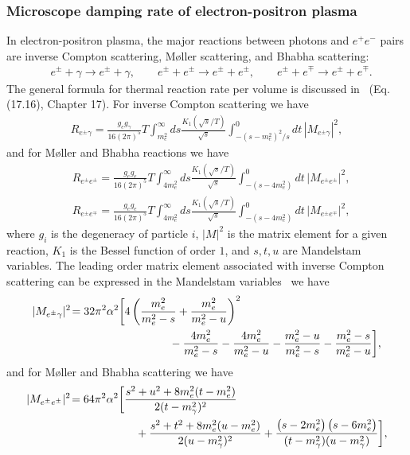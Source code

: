 \subsubsection{Microscope damping rate of electron-positron plasma}\label{relax}
In electron-positron plasma, the major reactions between photons and $e^+e^-$ pairs are inverse Compton scattering, M{\o}ller scattering, and Bhabha scattering:
\begin{align}
&e^\pm+\gamma\longrightarrow e^\pm+\gamma,\qquad e^\pm+e^\pm\longrightarrow e^\pm+e^\pm,\qquad e^\pm+e^\mp\longrightarrow e^\pm+e^\mp.
\end{align}
The general formula for thermal reaction rate per volume is discussed in~\cite{Letessier:2002ony} (Eq.(17.16), Chapter 17). For inverse Compton scattering we have
\begin{align}
R_{e^{\pm}\gamma}=\frac{g_eg_\gamma}{16\left(2\pi\right)^5}T\int_{m_e^2}^\infty\!\!\!\!ds\frac{K_1(\sqrt{s}/T)}{\sqrt{s}}\int^0_{-(s-m_e^2)^2/s}\!\!\!\!\!\!\!\!\!\!\!\!\!\!\!\!dt\, |M_{e^{\pm}\gamma}|^2,
\end{align} 
and for M{\o}ller and Bhabha reactions we have
\begin{align}
&R_{e^\pm e^\pm}=\frac{g_eg_e}{16\left(2\pi\right)^5}T\!\!\int_{4m_e^2}^\infty\!\!\!\!ds\frac{K_1(\sqrt{s}/T)}{\sqrt{s}}\int^0_{-(s-4m_e^2)}\!\!\!\!\!\!\!\!\!\!\!\!\!\!\!\!dt\,|M_{e^\pm e^\pm}|^2,\\
&R_{e^\pm e^\mp}=\frac{g_eg_e}{16\left(2\pi\right)^5}T\!\!\int_{4m_e^2}^\infty\!\!\!\!ds\frac{K_1(\sqrt{s}/T)}{\sqrt{s}}\int^0_{-(s-4m_e^2)}\!\!\!\!\!\!\!\!\!\!\!\!\!\!\!\!dt\,|M_{e^\pm e^\mp}|^2,
\end{align}
where $g_i$ is the degeneracy of particle $i$, $|M|^2$ is the matrix element for a given reaction, $K_1$ is the Bessel function of order $1$, and $s,t,u$ are Mandelstam variables. The leading order matrix element associated with inverse Compton scattering can be expressed in the Mandelstam variables~\cite{Kuznetsova:2011wt,Kuznetsova:2009bq} we have
\begin{align}
|M_{e^\pm\gamma}|^2\!=32 \pi^2\alpha^2\bigg[&4\left(\frac{m_e^2}{m_e^2-s}+\frac{m_e^2}{m_e^2-u}\right)^2\notag\\
&\qquad\qquad-\frac{4m_e^2}{m_e^2-s}-\frac{4m_e^2}{m_e^2-u} -
 \frac{m_e^2-u}{m_e^2-s} -\frac{m_e^2-s}{m_e^2-u}\bigg],
\end{align}
and for M{\o}ller and Bhabha scattering we have 
\begin{align}
|M_{e^{\pm}e^{\pm}}|^{2}\!=64\pi^{2}\alpha^{2}\bigg[&
\frac{s^{2}+u^{2}+8m_e^{2}(t-m_e^{2})}{2(t-m^2_{\gamma})^{2}}\notag\\
&\quad+\frac{{s^{2}+t^{2}}+8m_e^{2}
(u-m_e^{2})}{2(u-m_{\gamma}^2)^{2}} + \frac{\left( {s}-2m_e^{2}\right)\left({s}-6m_e^{2}\right)}
{(t-m_{\gamma}^2)(u-m_{\gamma}^2)} \bigg],
\end{align}
